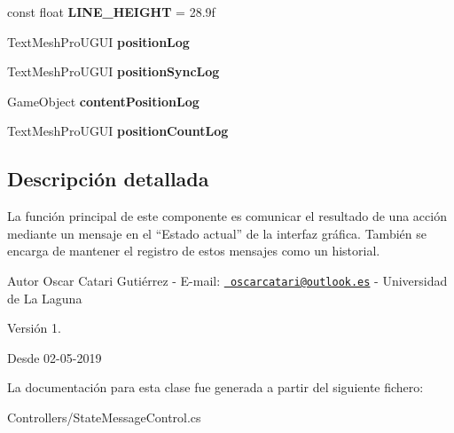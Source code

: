 \begin{DoxyCompactItemize}
const float {\bfseries L\+I\+N\+E\+\_\+\+H\+E\+I\+G\+HT} = 28.\+9f
\item 
\mbox{\label{class_state_message_control_ac3808f5bbfee4c03f97f27403c8b763b}} 
Text\+Mesh\+Pro\+U\+G\+UI {\bfseries position\+Log}
\item 
\mbox{\label{class_state_message_control_a6af53a37d357fe8ab24b6216a47e7189}} 
Text\+Mesh\+Pro\+U\+G\+UI {\bfseries position\+Sync\+Log}
\item 
\mbox{\label{class_state_message_control_ae8266da9f98d4560b5532f791e3359fe}} 
Game\+Object {\bfseries content\+Position\+Log}
\item 
\mbox{\label{class_state_message_control_a392f5ccb1932f006cb72209201c4480f}} 
Text\+Mesh\+Pro\+U\+G\+UI {\bfseries position\+Count\+Log}
\end{DoxyCompactItemize}


\subsection{Descripción detallada}
La función principal de este componente es comunicar el resultado de una acción mediante un mensaje en el “\+Estado actual” de la interfaz gráfica. También se encarga de mantener el registro de estos mensajes como un historial. \begin{DoxyAuthor}{Autor}
Oscar Catari Gutiérrez -\/ E-\/mail\+: \href{mailto:oscarcatari@outlook.es}{\texttt{ oscarcatari@outlook.\+es}} -\/ Universidad de La Laguna 
\end{DoxyAuthor}
\begin{DoxyVersion}{Versión}
1. 
\end{DoxyVersion}
\begin{DoxySince}{Desde}
02-\/05-\/2019 
\end{DoxySince}


La documentación para esta clase fue generada a partir del siguiente fichero\+:\begin{DoxyCompactItemize}
\item 
Controllers/State\+Message\+Control.\+cs\end{DoxyCompactItemize}
